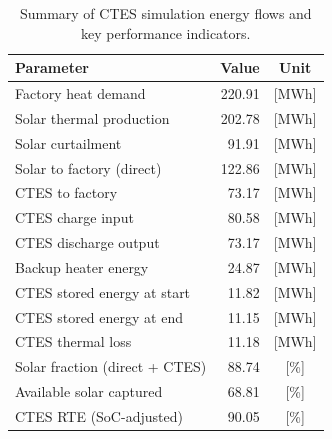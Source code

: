 \renewcommand{\arraystretch}{1.2}
\begin{table}[h]
\centering
\begin{tabular}{l|r c}
\hline
Parameter & Value & Unit \\
\hline
Factory heat demand & 220.91 & [MWh] \\
Solar thermal production & 202.78 & [MWh] \\
Solar curtailment & 91.91 & [MWh] \\
Solar to factory (direct) & 122.86 & [MWh] \\
CTES to factory & 73.17 & [MWh] \\
CTES charge input & 80.58 & [MWh] \\
CTES discharge output & 73.17 & [MWh] \\
Backup heater energy & 24.87 & [MWh] \\
CTES stored energy at start & 11.82 & [MWh] \\
CTES stored energy at end & 11.15 & [MWh] \\
CTES thermal loss & 11.18 & [MWh] \\
\hline
Solar fraction (direct + CTES) & 88.74 & [\%] \\
Available solar captured & 68.81 & [\%] \\
CTES RTE (SoC-adjusted) & 90.05 & [\%] \\
\hline
\end{tabular}
\caption{Summary of CTES simulation energy flows and key performance indicators.}
\label{tab:ctes-simulation-summary}
\end{table}

